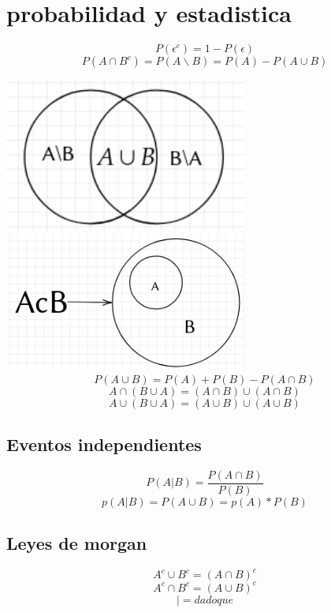 \section{probabilidad y estadistica}
	$$P(\epsilon^{c})=1-P(\epsilon)$$	
	$$P(A \cap B^{c}) =P(A \backslash B) =  P(A) - P(A \cup B)$$

	\includegraphics[width=8cm]{1.png}
	\includegraphics[width=8cm]{2.png}
	$$P(A \cup B) =P(A) + P(B) - P(A \cap B) $$
	$$ A \cap (B \cup A ) = (A \cap B) \cup (A \cap B) $$
	$$ A \cup (B \cup A ) = (A \cup B) \cup (A \cup B) $$


	\subsection{Eventos independientes}
	$$ P(A|B) = \frac{P(A \cap B )} { P(B) }$$
	$$ p(A|B) =  P(A \cup B) = p(A)*P(B) $$
	\subsection{Leyes de morgan}
	$$ A^{c} \cup B^{c} = (A \cap B)^{c} $$
	$$ A^{c} \cap B^{c} = (A \cup B)^{c} $$
	$$ | = dado que $$
